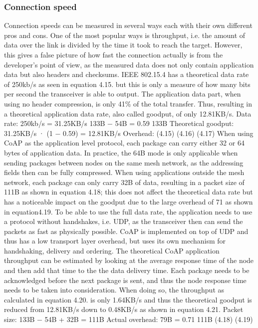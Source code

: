 \subsubsection{Connection speed}
Connection speeds can be measured in several ways each with their own different pros and cons.
One of the most popular ways is throughput,
	i.e.
the amount of data over the link is divided by the time it took to reach the target.
However,
	this gives a false picture of how fast the connection actually is from the developer’s point of view,
	as the measured data does not only contain application data but also headers and checksums.
IEEE 802.15.4 has a theoretical data rate of 250kb/s as seen in equation 4.15.
but this is only a measure of how many bits per second the transceiver is able to output.
The application data part,
	when using no header compression,
	is only 41\% of the total transfer.
Thus,
	resulting in a theoretical application
data rate,
	also called goodput,
	of only 12.81KB/s.
Data rate: 250kb/s = 31.25KB/s 133B − 54B = 0.59 133B Theoretical goodput: 31.25KB/s · (1 − 0.59) = 12.81KB/s Overhead:
	(4.15) (4.16) (4.17) When using CoAP as the application level protocol,
	each package can carry either 32 or 64 bytes of application data.
In practice,
	the 64B mode is only applicable when sending packages between nodes on the same mesh network,
	as the addressing fields then can be fully compressed.
When using applications outside the mesh network,
	each package can only carry 32B of data,
	resulting in a packet size of 111B as shown in equation 4.18;
	this does not affect the theoretical data rate but has a noticeable impact on the goodput due to the large overhead of 71%
	as shown in equation4.19.
To be able to use the full data rate,
	the application needs to use a protocol without handshakes,
	i.e.
UDP,
	as the transceiver then can send the packets as fast as physically possible.
CoAP is implemented on top of UDP and thus has a low transport layer overhead,
	but uses its own mechanism for handshaking,
	delivery and ordering.
The theoretical CoAP application throughput can be estimated by looking at the average response time of the node and then add that time to the the data delivery time.
Each package needs to be acknowledged before the next package is sent,
	and thus the node response time needs to be taken into consideration.
When doing so,
	the throughput as calculated in equation 4.20.
is only 1.64KB/s and thus the theoretical goodput is reduced from 12.81KB/s down to 0.48KB/s as shown in equation 4.21.
Packet size: 133B − 54B + 32B = 111B Actual overhead: 79B = 0.71 111B (4.18) (4.19) 

